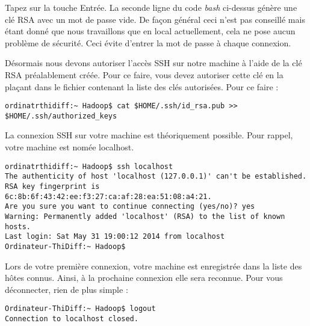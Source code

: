 \par Tapez sur la touche Entrée. La seconde ligne du code \textit{bash} ci-dessus génère une clé RSA avec un mot de passe vide. De façon général ceci n'est pas conseillé mais étant donné que nous travaillons que en local actuellement, cela ne pose aucun problème de sécurité. Ceci évite d'entrer la mot de passe à chaque connexion.

\par Désormais nous devons autoriser l'accès SSH sur notre machine à l'aide de la clé RSA préalablement créée. Pour ce faire, vous devez autoriser cette clé en la plaçant dans le fichier contenant la liste des clés autorisées. Pour ce faire :

\begin{verbatim}
ordinatrthidiff:~ Hadoop$ cat $HOME/.ssh/id_rsa.pub >> $HOME/.ssh/authorized_keys
\end{verbatim}

\par La connexion SSH sur votre machine est théoriquement possible. Pour rappel, votre machine est nomée localhost.

\begin{verbatim}
ordinatrthidiff:~ Hadoop$ ssh localhost
The authenticity of host 'localhost (127.0.0.1)' can't be established.
RSA key fingerprint is 6c:8b:6f:43:42:ee:f3:27:ca:af:28:ea:51:08:a4:21.
Are you sure you want to continue connecting (yes/no)? yes
Warning: Permanently added 'localhost' (RSA) to the list of known hosts.
Last login: Sat May 31 19:00:12 2014 from localhost
Ordinateur-ThiDiff:~ Hadoop$
\end{verbatim} 

\par Lors de votre première connexion, votre machine est enregistrée dans la liste des hôtes connus. Ainsi, à la prochaine connexion elle sera reconnue. Pour vous déconnecter, rien de plus simple :

\begin{verbatim}
Ordinateur-ThiDiff:~ Hadoop$ logout
Connection to localhost closed.
\end{verbatim}

